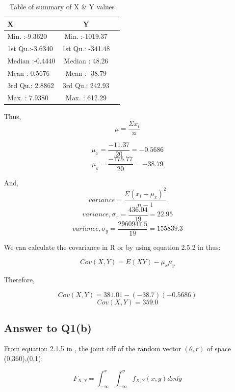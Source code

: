 \begin{table}[!h]
\small
\centering
\begin{tabular}{|l|c|r|}
\hline
 X & Y \\
\hline    
 Min.   :-9.3620 &  Min.   :-1019.37  \\
 1st Qu.:-3.6340 &  1st Qu.: -341.48  \\
 Median :-0.4440 &  Median :   48.26  \\
 Mean   :-0.5676 &  Mean   :  -38.79  \\
 3rd Qu.: 2.8862 &  3rd Qu.:  242.93  \\
 Max.   : 7.9380 &  Max.   :  612.29  \\
\hline
\end{tabular}
\caption{Table of summary of X \& Y values}
\label{example:table}
\end{table}

Thus,
\begin{equation} \mu = \frac{\Sigma x_i}{n} \label{q2a1} \end{equation}

$$ \mu_x = \frac{-11.37}{20} = -0.5686 $$
$$ \mu_y = \frac{-775.77}{20} = -38.79 $$

And,
\begin{equation} variance = \frac{\Sigma (x_i - \mu_x)^2}{n-1} \label{q2a1} \end{equation}
$$ variance, \sigma_x = \frac{436.04}{19} = 22.95 $$
$$ variance, \sigma_y = \frac{2960947.5}{19} = 155839.3 $$

We can calculate the covariance in R \parencite[281]{Tilman:RBK}or by using equation 2.5.2 in \parencite[126]{Hogg:ITM} thus:

\begin{equation}  Cov(X,Y) = E(XY) - {\mu}_x{\mu}_y \label{q2a1} \end{equation}

Therefore,

$$ Cov(X,Y) = 381.01 - (-38.7)(-0.5686) $$
$$ Cov(X,Y) = 359.0 $$


\subsection{Answer to Q1(b)} 
From equation 2.1.5 in \cite{Hogg:ITM}, the joint \ac{cdf} of the random vector $(\theta, r)$ of space {(0,360),(0,1)}:

\begin{equation} F_{X,Y} = \int_{-\infty}^{x}\int_{-\infty}^{y}f_{X,Y}(x,y)dxdy \label{q2b} \end{equation}


